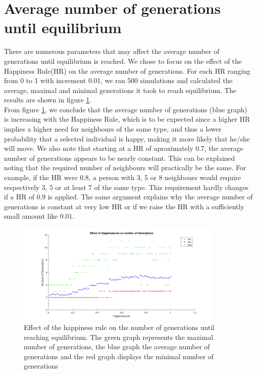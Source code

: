 
\section{Average number of generations until equilibrium}\label{sec:aantgen}
There are numerous parameters that may affect the average number of generations until  equilibrium is reached. 
We chose to focus on the effect of the Happiness Rule(HR) on the average number of generations. 
For each HR ranging from 0 to 1 with increment 0.01, we ran 500 simulations and calculated the average, maximal and minimal generations it took to reach equilibrium. 
The results are shown in figure \ref{fig:avegen}.\\

From figure \ref{fig:avegen}, we conclude that the average number of generations (blue graph) is increasing with the Happiness Rule, which is to be expected since a higher HR implies a higher need for neighbours of the same type, and thus a lower probability that a selected individual is happy, making it more likely that he/she will move. 
We also note that starting at a HR of aproximately 0.7, the average number of generations appears to be nearly constant. 
This can be explained noting that the required number of neighbours will practically be the same. 
For example, if the HR were 0.8, a person with 3, 5 or 8 neighbours would require respectively 3, 5 or at least 7 of the same type. 
This requirement hardly changes if a HR of 0.9 is applied. 
The same argument explains why the average number of generations is constant at very low HR or if we raise the HR with a sufficiently small amount like $0.01$.

\begin{figure}[h!]
    \centering
    \includegraphics[width=0.9\textwidth]{happinessregel_aantgen_2.pdf}
    \caption{Effect of the happiness rule on the number of generations until reaching equilibrium. 
    The green graph represents the maximal number of generations, the blue graph the average number of generations and the red graph displays the minimal number of generations}
    \label{fig:avegen}
\end{figure}

